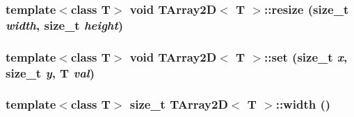 \label{classTArray2D_adc97abfe0160c0377fd391f73cf7cb16}
\hypertarget{classTArray2D_aad2277f4ebb58d11211bb405eea6d631}{
\subsubsection[{resize}]{\setlength{\rightskip}{0pt plus 5cm}template$<$class T$>$ void {\bf TArray2D}$<$ T $>$::resize (size\_\-t {\em width}, \/  size\_\-t {\em height})}}
\label{classTArray2D_aad2277f4ebb58d11211bb405eea6d631}
\hypertarget{classTArray2D_a0ab9fdf7a0c039c8519e711ca319c7bc}{
\subsubsection[{set}]{\setlength{\rightskip}{0pt plus 5cm}template$<$class T$>$ void {\bf TArray2D}$<$ T $>$::set (size\_\-t {\em x}, \/  size\_\-t {\em y}, \/  T {\em val})}}
\label{classTArray2D_a0ab9fdf7a0c039c8519e711ca319c7bc}
\hypertarget{classTArray2D_ac1831c05d26c7fa073b6d4c256ea911d}{
\subsubsection[{width}]{\setlength{\rightskip}{0pt plus 5cm}template$<$class T$>$ size\_\-t {\bf TArray2D}$<$ T $>$::width ()}}
\label{classTArray2D_ac1831c05d26c7fa073b6d4c256ea911d}


